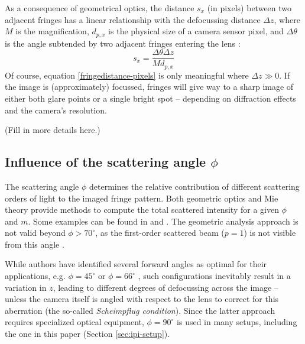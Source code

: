 \documentclass[10pt]{book}
\begin{document}
As a consequence of geometrical optics, the distance $s_x$ (in pixels) between two
adjacent fringes has a linear relationship with the defocussing distance $\Delta
z$, where $M$ is the magnification, $d_{p,x}$ is the physical size of a
camera sensor pixel, and $\Delta \theta$ is the angle subtended by two adjacent
fringes entering the lens \cite{Pan06}:
\begin{equation}
  s_x = \frac{\Delta \theta \Delta z}{M d_{p,x}} 
  \label{fringedistance-pixels}
\end{equation}
Of course, equation \eqref{fringedistance-pixels} is only meaningful where $\Delta z \gg
0$. If the image is (approximately) focussed, fringes will give way to a sharp
image of either both glare points or a single bright spot -- depending on
diffraction effects and the camera's resolution.

(Fill in more details here.)
\subsection{Influence of the scattering angle $\phi$}
The scattering angle $\phi$ determines the relative contribution of 
different scattering orders of light to the imaged fringe pattern. Both
geometric optics \cite{Vandehulst12} and Mie theory provide methods to compute
the total scattered intensity for a given $\phi$ and $m$. Some examples can be
found in \citet{Kawaguchi02} and \citet{Mounaim99}. The geometric analysis
approach is not valid beyond $\phi > 70^\circ$, as the first-order
scattered beam ($p=1$) is not visible from this angle \cite{Glover95}.

While authors have identified several forward angles as optimal for their
applications, e.g. $\phi = 45^\circ$ \cite{Glover95} or $\phi = 66^\circ$
\cite{Mounaim99}, such configurations inevitably result in a variation in $z$,
leading to different degrees of defocussing across the image -- unless the
camera itself is angled with respect to the lens to correct for this
aberration (the so-called \emph{Scheimpflug condition}). Since the latter
approach requires specialized optical equipment, $\phi = 90^\circ$ is used in
many setups, including the one in this paper (Section \ref{sec:ipi-setup}).
\end{document}
